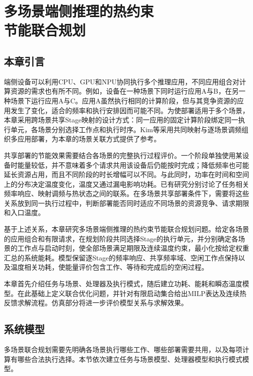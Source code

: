 \chapter[多场景端侧推理的热约束节能联合规划]{多场景端侧推理的热约束\\节能联合规划}
\label{chap:model}

\section{本章引言}

端侧设备可以利用CPU、GPU和NPU协同执行多个推理应用，不同应用组合对计算资源的需求也有所不同。例如，设备在一种场景下同时运行应用A与B，在另一种场景下运行应用A与C。应用A虽然执行相同的计算阶段，但与其竞争资源的应用发生了变化，适合的频率和执行安排因而可能不同。为使部署适用于多个场景，本章采用跨场景共享Stage映射的设计方式：同一应用的固定计算阶段绑定同一执行单元，各场景分别选择工作点和执行时序。Kim等采用共同映射与逐场景调频组织多应用部署\cite{kim2023scenario}，为本章的场景关联方式提供了参考。

共享部署的节能效果需要结合各场景的完整执行过程评价。一个阶段单独使用某设备时能量较低，并不意味着多个请求共用该设备后仍能按时完成；降低频率也可能延长资源占用，而且不同阶段的时长增幅可以不同。与此同时，功率在时间和空间上的分布决定温度变化，温度又通过漏电影响功耗。已有研究分别讨论了任务相关频率响应、映射调频与热状态之间的联系\cite{source2,source1,fdtm2022}。在多场景共享部署条件下，需要将这些关系放到同一执行过程中，判断部署能否同时适应不同场景的资源竞争、请求期限和入口温度。

基于上述关系，本章研究多场景端侧推理的热约束节能联合规划问题。给定各场景的应用组合和有限请求，在规划阶段共同选择Stage的执行单元，并分别确定各场景的工作点与启动时刻，使全部场景满足期限及连续温度约束，最小化按给定权重汇总的系统能耗。模型保留逐Stage的频率响应、共享频率域、空闲工作点保持以及温度相关功耗，使能量评价包含工作、等待和完成后的空闲过程。

本章首先介绍任务与场景、处理器及执行模式，随后建立功耗、能耗和瞬态温度模型。在此基础上定义联合优化问题，并针对有限启动集合给出MILP表达及连续热反馈求解流程。仿真部分将进一步评价模型关系与求解效果。

\section{系统模型}

多场景联合规划需要先明确各场景执行哪些工作、哪些部署需要共用，以及每项计算有哪些合法执行选择。本节依次建立任务与场景模型、处理器模型和执行模式模型。

